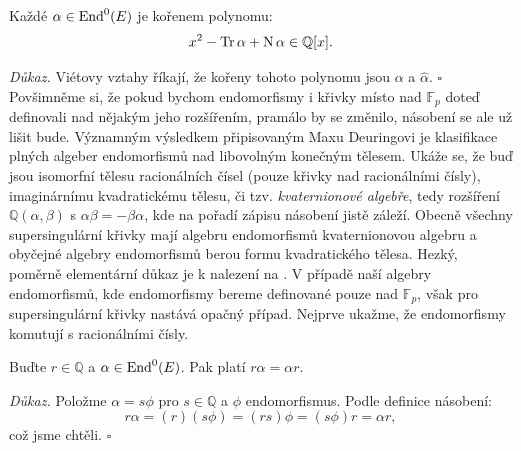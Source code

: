 \documentclass[12pt]{report}
\begin{document}
\begin{veta}
Každé $\alpha \in \operatorname{End}^0 (E)$ je kořenem polynomu:
\begin{equation*}
x^2 - \operatorname{Tr} \alpha + \operatorname{N} \alpha \in \mathbb{Q}[x].
\end{equation*}
\end{veta}
\noindent \textit{Důkaz.} Viétovy vztahy říkají, že kořeny tohoto polynomu jsou $\alpha$ a $\widehat{\alpha}$. \hfill $\square$\\

Povšimněme si, že pokud bychom endomorfismy i křivky místo nad $\mathbb{F}_p$ doteď definovali nad nějakým jeho rozšířením, pramálo by se změnilo, násobení se ale už lišit bude. Významným výsledkem připisovaným Maxu Deuringovi \cite{Deuring} je klasifikace plných algeber endomorfismů nad libovolným konečným tělesem. Ukáže se, že buď jsou isomorfní tělesu racionálních čísel (pouze křivky nad racionálními čísly), imaginárnímu kvadratickému tělesu, či tzv. \textit{kvaternionové algebře}, tedy rozšíření $\mathbb{Q}(\alpha,\beta)$ s $\alpha \beta = - \beta \alpha$, kde na pořadí zápisu násobení jistě záleží. Obecně všechny supersingulární křivky mají algebru endomorfismů kvaternionovou algebru a obyčejné algebry endomorfismů berou formu kvadratického tělesa. Hezký, poměrně elementární důkaz je k nalezení na \cite[Thm. 13.17]{Sutherland}. V případě naší  algebry endomorfismů, kde endomorfismy bereme definované pouze nad $\mathbb{F}_p$, však pro supersingulární křivky nastává opačný případ. Nejprve ukažme, že endomorfismy komutují s racionálními čísly.

\begin{lemma}
Buďte $r \in \mathbb{Q}$ a $\alpha \in \operatorname{End}^0 (E)$. Pak platí $r \alpha = \alpha r$.
\end{lemma}
\noindent \textit{Důkaz.} Položme $\alpha = s \phi$ pro $s \in \mathbb{Q}$ a $\phi$ endomorfismus. Podle definice násobení:
\begin{equation*}
r \alpha = (r) (s \phi) = (rs) \phi = (s \phi) r = \alpha r,
\end{equation*}
což jsme chtěli. \hfill $\square$\\
\end{document}
